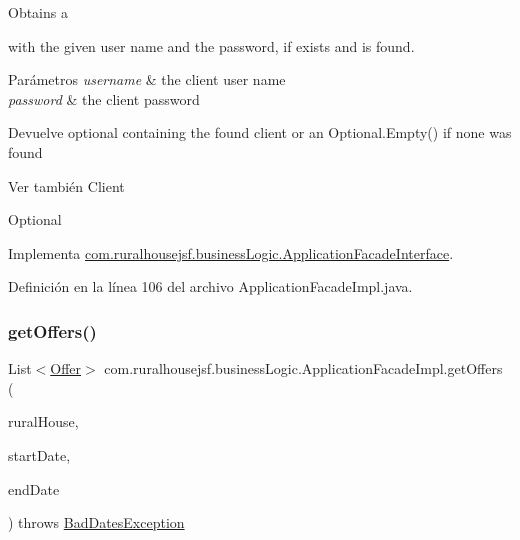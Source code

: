 Obtains a
\begin{DoxyCode}{0}
\end{DoxyCode}
 with the given user name and the password, if exists and is found.


\begin{DoxyParams}{Parámetros}
{\em username} & the client user name \\
\hline
{\em password} & the client password\\
\hline
\end{DoxyParams}
\begin{DoxyReturn}{Devuelve}
optional containing the found client or an {\ttfamily Optional.\+Empty()} if none was found
\end{DoxyReturn}
\begin{DoxySeeAlso}{Ver también}
Client 

Optional 
\end{DoxySeeAlso}


Implementa \mbox{\hyperlink{interfacecom_1_1ruralhousejsf_1_1business_logic_1_1_application_facade_interface_af9901ddc9cbe77aaa08085c3c19167c6}{com.\+ruralhousejsf.\+business\+Logic.\+Application\+Facade\+Interface}}.



Definición en la línea 106 del archivo Application\+Facade\+Impl.\+java.

\mbox{\label{classcom_1_1ruralhousejsf_1_1business_logic_1_1_application_facade_impl_a131acc04c80b3860f98d713d3a8ea5a5}} 
\subsubsection{\texorpdfstring{getOffers()}{getOffers()}\hspace{0.1cm}{\footnotesize\ttfamily [1/2]}}
{\footnotesize\ttfamily List$<$\mbox{\hyperlink{classcom_1_1ruralhousejsf_1_1domain_1_1_offer}{Offer}}$>$ com.\+ruralhousejsf.\+business\+Logic.\+Application\+Facade\+Impl.\+get\+Offers (\begin{DoxyParamCaption}\item[{\mbox{\hyperlink{classcom_1_1ruralhousejsf_1_1domain_1_1_rural_house}{Rural\+House}}}]{rural\+House,  }\item[{Local\+Date}]{start\+Date,  }\item[{Local\+Date}]{end\+Date }\end{DoxyParamCaption}) throws \mbox{\hyperlink{classcom_1_1ruralhousejsf_1_1exceptions_1_1_bad_dates_exception}{Bad\+Dates\+Exception}}}

